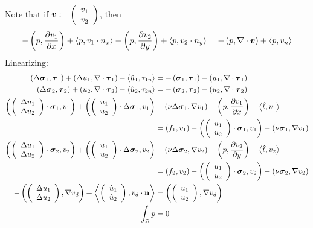 \documentclass{article}
\begin{document}
Note that if $\bfv:=\vecttwo{v_1}{v_2}$, then
\[
-\LRp{p,\frac{\partial v_1}{\partial x}}
+\LRa{p,v_1\cdot n_x}
-\LRp{p,\frac{\partial v_2}{\partial y}}
+\LRa{p,v_2\cdot n_y}
=-\LRp{p,\Div\bfv}+\LRa{p,v_n}
\]
Linearizing:
\begin{align*}
  \LRp{\Delta\bfsigma_1,\bftau_1}
  +\LRp{\Delta u_1,\Div\bftau_1}
  -\LRa{\hat u_1,\tau_{1n}}&=
  -\LRp{\bfsigma_1,\bftau_1}
  -\LRp{u_1,\Div\bftau_1}
  \\
  \LRp{\Delta\bfsigma_2,\bftau_2}
  +\LRp{u_2,\Div\bftau_2}
  -\LRa{\hat u_2,\tau_{2n}}&=
  -\LRp{\bfsigma_2,\bftau_2}
  -\LRp{u_2,\Div\bftau_2}
  \\
  \LRp{\vecttwo{\Delta u_1}{\Delta u_2}\cdot\bfsigma_1,v_1}
  +\LRp{\vecttwo{u_1}{u_2}\cdot\Delta\bfsigma_1,v_1}&
  +\LRp{\nu\Delta\bfsigma_1,\Grad v_1}
  -\LRp{p,\frac{\partial v_1}{\partial x}}
  +\LRa{\hat t,v_1}
  \\&=\LRp{f_1,v_1}
  -\LRp{\vecttwo{u_1}{u_2}\cdot\bfsigma_1,v_1}
  -\LRp{\nu\bfsigma_1,\Grad v_1}
  \\
  \LRp{\vecttwo{\Delta u_1}{\Delta u_2}\cdot\bfsigma_2,v_2}
  +\LRp{\vecttwo{u_1}{u_2}\cdot\Delta\bfsigma_2,v_2}&
  +\LRp{\nu\Delta\bfsigma_2,\Grad v_2}
  -\LRp{p,\frac{\partial v_2}{\partial y}}
  +\LRa{\hat t,v_2}
  \\&=\LRp{f_2,v_2}
  -\LRp{\vecttwo{u_1}{u_2}\cdot\bfsigma_2,v_2}
  -\LRp{\nu\bfsigma_2,\Grad v_2}
  \\
  -\LRp{\vecttwo{\Delta u_1}{\Delta u_2},\Grad v_d}
  +\LRa{\vecttwo{\hat u_1}{\hat u_2},v_d\cdot\mathbf{n}}&=
  \LRp{\vecttwo{u_1}{u_2},\Grad v_d}
  \\
  \int_\Omega p&=0
\end{align*}
\end{document}
